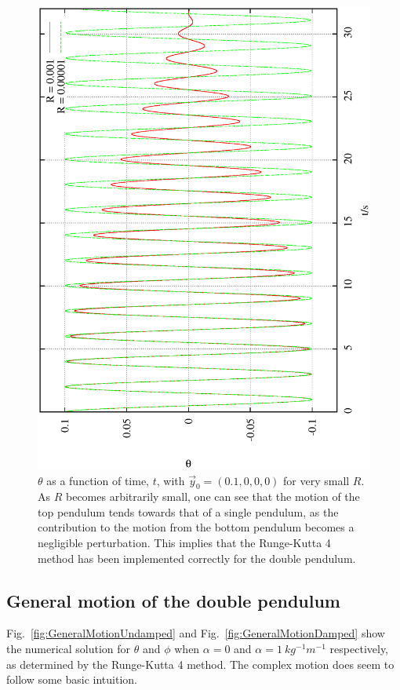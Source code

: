 \documentclass[10pt,a4paper]{article}
\begin{document}
\begin{figure}[h!]
\begin{center}
\includegraphics[scale = 0.6, angle =-90]{approxSingle.eps}
\caption{$\theta$ as a function of time, $t$, with $\vec{y}_{0}=(0.1,0,0,0)$ for very small $R$. As $R$ becomes arbitrarily small, one can see that the motion of the top pendulum tends towards that of a single pendulum, as the contribution to the motion from the bottom pendulum becomes a negligible perturbation. This implies that the Runge-Kutta 4 method has been implemented correctly for the double pendulum.}
\label{fig:SmallR}
\end{center}
\end{figure}
\newpage
\subsection{General motion of the double pendulum}
 Fig.~\ref{fig:GeneralMotionUndamped} and  Fig.~\ref{fig:GeneralMotionDamped} show the numerical solution for $\theta$ and $\phi$ when $\alpha = 0$ and $\alpha = 1\:kg^{-1} m^{-1}$ respectively, as determined by the Runge-Kutta 4 method. The complex motion does seem to follow some basic intuition.
\end{document}
